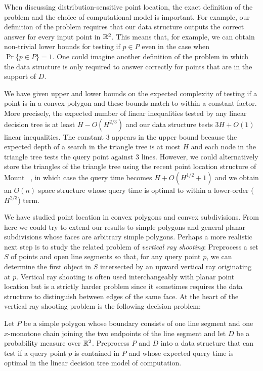\documentclass[charterfonts,lotsofwhite]{patmorin}
\begin{document}
When discussing distribution-sensitive point location, the exact
definition of the problem and the choice of computational model is
important.  For example, our definition of the problem requires that
our data structure outputs the correct answer for every input point in
$\mathbb{R}^2$.  This means that, for example, we can obtain non-trivial lower
bounds for testing if $p\in P$ even in the case when $\Pr\{p\in
P\}=1$. One could imagine another definition of the problem in which
the data structure is only required to answer correctly for points
that are in the support of $D$.

We have given upper and lower bounds on the expected complexity of
testing if a point is in a convex polygon and these bounds match to
within a constant factor.  More precisely, the expected number of
linear inequalities tested by any linear decision tree is at least
$H-O(H^{2/3})$ and our data structure tests $3H+O(1)$ linear
inequalities. The constant 3 appears in the upper bound because the
expected depth of a search in the triangle tree is at most $H$ and
each node in the triangle tree tests the query point against 3 lines.
However, we could alternatively store the triangles of the triangle
tree using the recent point location structure of Mount \etal\
\cite{ammw07}, in which case the query time becomes $H+O(H^{1/2}+1)$ and
we obtain an $O(n)$ space structure whose query time is optimal to
within a lower-order ($H^{2/3}$) term.

We have studied point location in convex polygons and convex
subdivisions.  From here we could try to extend our results to simple
polygons and general planar subdivisions whose faces are arbitrary
simple polygons. Perhaps a more realistic next step is to study the
related problem of \emph{vertical ray shooting}:  Preprocess a set $S$
of points and open line segments so that, for any query point $p$, we
can determine the first object in $S$ intersected by an upward
vertical ray originating at $p$.  Vertical ray shooting is often used
interchangeably with planar point location but is a strictly harder
problem since it sometimes requires the data structure to distinguish
between edges of the same face.  At the heart of the vertical ray
shooting problem is the following decision problem:

\begin{op}
Let $P$ be a simple polygon whose
boundary consists of one line segment and one $x$-monotone chain
joining the two endpoints of the line segment and let $D$ be a
probability measure over $\mathbb{R}^2$. Preprocess $P$ and $D$ into a data
structure that can test if a query point $p$ is contained in $P$ and
whose expected query time is optimal in the linear decision tree model
of computation.
\end{op}



\end{document}
